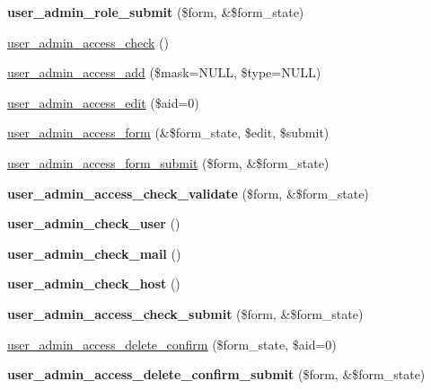 \begin{CompactItemize}
\item 
\hypertarget{user_8admin_8inc_c85f25cd1c59104fcc4dc4f7b9dfbd2e}{
\textbf{user\_\-admin\_\-role\_\-submit} (\$form, \&\$form\_\-state)}
\label{user_8admin_8inc_c85f25cd1c59104fcc4dc4f7b9dfbd2e}

\item 
\hyperlink{user_8admin_8inc_d0bc9db07cf5e16156c0f1eeff5ee675}{user\_\-admin\_\-access\_\-check} ()
\item 
\hyperlink{user_8admin_8inc_e95f2dfc6d335639b68daa040ca773ef}{user\_\-admin\_\-access\_\-add} (\$mask=NULL, \$type=NULL)
\item 
\hyperlink{user_8admin_8inc_1a1124d9c69fc269df4a829022b4e31a}{user\_\-admin\_\-access\_\-edit} (\$aid=0)
\item 
\hyperlink{group__forms_g47c21b0d7ce383f4e8b25a71b064a8ef}{user\_\-admin\_\-access\_\-form} (\&\$form\_\-state, \$edit, \$submit)
\item 
\hyperlink{user_8admin_8inc_6ccedba4491a28dbdcb607f94c8f8b25}{user\_\-admin\_\-access\_\-form\_\-submit} (\$form, \&\$form\_\-state)
\item 
\hypertarget{user_8admin_8inc_a29c4aef0ef2d177b31db80b5789aa47}{
\textbf{user\_\-admin\_\-access\_\-check\_\-validate} (\$form, \&\$form\_\-state)}
\label{user_8admin_8inc_a29c4aef0ef2d177b31db80b5789aa47}

\item 
\hypertarget{user_8admin_8inc_2810713cec10c40bbbae76ccaac164eb}{
\textbf{user\_\-admin\_\-check\_\-user} ()}
\label{user_8admin_8inc_2810713cec10c40bbbae76ccaac164eb}

\item 
\hypertarget{user_8admin_8inc_3c0cf558e736676b01bccb1651546e1e}{
\textbf{user\_\-admin\_\-check\_\-mail} ()}
\label{user_8admin_8inc_3c0cf558e736676b01bccb1651546e1e}

\item 
\hypertarget{user_8admin_8inc_dec6b10cc6efb399b770fbf1b82c6f16}{
\textbf{user\_\-admin\_\-check\_\-host} ()}
\label{user_8admin_8inc_dec6b10cc6efb399b770fbf1b82c6f16}

\item 
\hypertarget{user_8admin_8inc_2a8af2ae2774f2e92dbb98d097c548c2}{
\textbf{user\_\-admin\_\-access\_\-check\_\-submit} (\$form, \&\$form\_\-state)}
\label{user_8admin_8inc_2a8af2ae2774f2e92dbb98d097c548c2}

\item 
\hyperlink{group__forms_g616ad786bd3f986b01b73f554527203f}{user\_\-admin\_\-access\_\-delete\_\-confirm} (\$form\_\-state, \$aid=0)
\item 
\hypertarget{user_8admin_8inc_385f0b4c6673fb33301e7a598c93b9de}{
\textbf{user\_\-admin\_\-access\_\-delete\_\-confirm\_\-submit} (\$form, \&\$form\_\-state)}
\label{user_8admin_8inc_385f0b4c6673fb33301e7a598c93b9de}


\end{CompactItemize}
